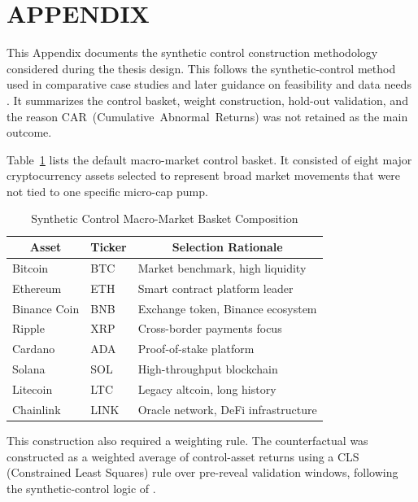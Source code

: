 \chapter*{APPENDIX}
{}
\setcounter{secnumdepth}{0}

This Appendix documents the synthetic control construction methodology considered during the thesis design. This follows the synthetic-control method used in comparative case studies and later guidance on feasibility and data needs \cite{abadie2010synthetic, abadie2021synthetic}. It summarizes the control basket, weight construction, hold-out validation, and the reason CAR~\mbox{(Cumulative Abnormal Returns)} was not retained as the main outcome.

Table~\ref{tab:app-control-basket} lists the default macro-market control basket. It consisted of eight major cryptocurrency assets selected to represent broad market movements that were not tied to one specific micro-cap pump.

\begin{table}[htbp]
\centering
\caption{Synthetic Control Macro-Market Basket Composition}
\label{tab:app-control-basket}
\begin{tabular}{|l|l|p{6.5cm}|}
\toprule
\multicolumn{1}{|c|}{Asset} & \multicolumn{1}{c|}{Ticker} & \multicolumn{1}{c|}{Selection Rationale} \\
\midrule
Bitcoin & BTC & Market benchmark, high liquidity \\
Ethereum & ETH & Smart contract platform leader \\
Binance Coin & BNB & Exchange token, Binance ecosystem \\
Ripple & XRP & Cross-border payments focus \\
Cardano & ADA & Proof-of-stake platform \\
Solana & SOL & High-throughput blockchain \\
Litecoin & LTC & Legacy altcoin, long history \\
Chainlink & LINK & Oracle network, DeFi infrastructure \\
\bottomrule
\end{tabular}
\ownsource
\end{table}

This construction also required a weighting rule. The counterfactual was constructed as a weighted average of control-asset returns using a CLS (Constrained Least Squares) rule over pre-reveal validation windows, following the synthetic-control logic of \cite{abadie2010synthetic}.

